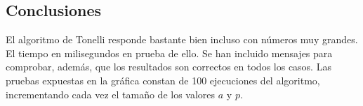 \documentclass[12pt,spanish]{article}
\begin{document}
		\subsection{Conclusiones}
		
El algoritmo de Tonelli responde bastante bien incluso con números muy grandes. El tiempo en milisegundos en prueba de ello. Se han incluido mensajes para comprobar, además, que los resultados son correctos en todos los casos. Las pruebas expuestas en la gráfica constan de 100 ejecuciones del algoritmo, incrementando cada vez el tamaño de los valores $a$ y $p$.		
		
\end{document}
